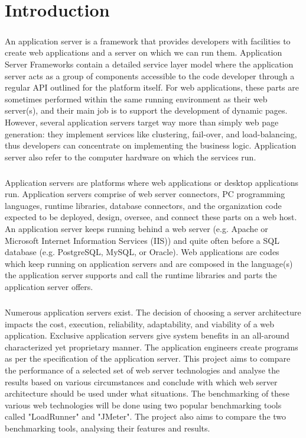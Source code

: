 \documentclass[../thesis.tex]{subfiles}
\begin{document}
\chapter{Introduction}

\paragraph{}
An application server is a framework that provides developers with facilities to create web applications and a server on which we can run them. Application Server Frameworks contain a detailed service layer model where the application server acts as a group of components accessible to the code developer through a regular API outlined for the platform itself. For web applications, these parts are sometimes performed within the same running environment as their web server(s), and their main job is to support the development of dynamic pages. However, several application servers target way more than simply web page generation: they implement services like clustering, fail-over, and load-balancing, thus developers can concentrate on implementing the business logic.
Application server also refer to the computer hardware on which the services run.
\paragraph{}
Application servers are platforms where web applications or desktop applications run. Application servers comprise of web server connectors, PC programming languages, runtime libraries, database connectors, and the organization code expected to be deployed, design, oversee, and connect these parts on a web host. An application server keeps running behind a web server (e.g. Apache or Microsoft Internet Information Services (IIS)) and quite often before a SQL database (e.g. PostgreSQL, MySQL, or Oracle). Web applications are codes which keep running on application servers and are composed in the language(s) the application server supports and call the runtime libraries and parts the application server offers.
\paragraph{}
Numerous application servers exist. The decision of choosing a server architecture impacts the cost, execution, reliability, adaptability, and viability of a web application. Exclusive application servers give system benefits in an all-around characterized yet proprietary manner. The application engineers create programs as per the specification of the application server. This project aims to compare the performance of a selected set of web server technologies and analyse the results based on various circumstances and conclude with which web server architecture should be used under what situations. The benchmarking of these various web technologies will be done using two popular benchmarking tools called "LoadRunner" and "JMeter". The project also aims to compare the two benchmarking tools, analysing their features and results.
\end{document}
